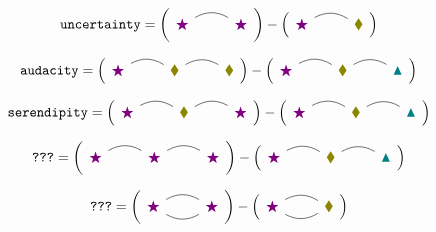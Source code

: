 \documentclass{article}
\newcommand{\actson}[1]{\arrow[bend left=30,dash,#1]}
\newcommand{\alsoactson}[1]{\arrow[bend right=30,dash,#1]}
\newcommand{\reddisk}{{\color{violet}\bigstar}}
\newcommand{\greendisk}{{\color{olive}\blacklozenge}}
\newcommand{\bluedisk}{{\color{teal}\blacktriangle}}
\begin{document}
    $$
        \texttt{uncertainty} = 
        \left(\begin{tikzcd}
            \reddisk \actson{r} & \reddisk
        \end{tikzcd}\right)
        - 
        \left(\begin{tikzcd}
            \reddisk \actson{r} & \greendisk
        \end{tikzcd}\right)
    $$

    $$
        \texttt{audacity} = 
        \left(\begin{tikzcd}
            \reddisk \actson{r} & \greendisk \actson{r} & \greendisk
        \end{tikzcd}\right)
        - 
        \left(\begin{tikzcd}
            \reddisk \actson{r} & \greendisk \actson{r} & \bluedisk
        \end{tikzcd}\right)
    $$

    $$
        \texttt{serendipity} = 
        \left(\begin{tikzcd}
            \reddisk \actson{r} & \greendisk \actson{r} & \reddisk
        \end{tikzcd}\right)
        - 
        \left(\begin{tikzcd}
            \reddisk \actson{r} & \greendisk \actson{r} & \bluedisk
        \end{tikzcd}\right)
    $$

    $$
        \texttt{???} = 
        \left(\begin{tikzcd}
            \reddisk \actson{r} & \reddisk \actson{r} & \reddisk
        \end{tikzcd}\right)
        - 
        \left(\begin{tikzcd}
            \reddisk \actson{r} & \greendisk \actson{r} & \bluedisk
        \end{tikzcd}\right)
    $$

    $$
        \texttt{???} = 
        \left(\begin{tikzcd}
            \reddisk \actson{r}\alsoactson{r} & \reddisk
        \end{tikzcd}\right)
        - 
        \left(\begin{tikzcd}
            \reddisk \actson{r}\alsoactson{r} & \greendisk
        \end{tikzcd}\right)
    $$
\end{document}
